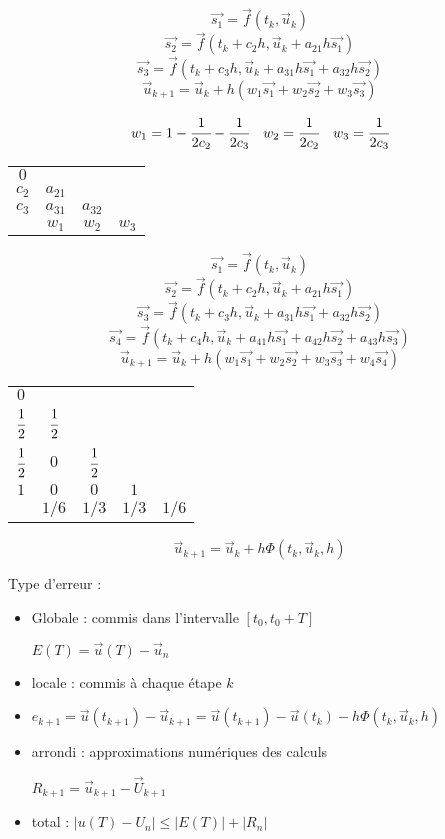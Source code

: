 
$$ \vec{s_1} = \vec{f}(t_k, \vec{u}_k) $$
$$ \vec{s_2} = \vec{f}(t_k + c_2 h, \vec{u}_k + a_{21} h \vec{s_1}) $$
$$ \vec{s_3} = \vec{f}(t_k + c_3 h, \vec{u}_k + a_{31} h \vec{s_1} + a_{32} h \vec{s_2}) $$
$$ \vec{u}_{k+1} = \vec{u}_k + h (w_1 \vec{s_1} + w_2 \vec{s_2} + w_3 \vec{s_3}) $$

$$ w_1 = 1 - \cfrac{1}{2c_2} - \cfrac{1}{2c_3} \quad w_2 = \cfrac{1}{2c_2} \quad w_3 = \cfrac{1}{2c_3} $$

\begin{tabular}{c|ccc}
    $0$ &  &  &  \\
    $c_2$ & $a_{21}$ &  &  \\
    $c_3$ & $a_{31}$ & $a_{32}$ &  \\
    \hline
          & $w_1$    & $w_2$    & $w_3$ \\
\end{tabular}


$$ \vec{s_1} = \vec{f}(t_k, \vec{u}_k) $$
$$ \vec{s_2} = \vec{f}(t_k + c_2 h, \vec{u}_k + a_{21} h \vec{s_1}) $$
$$ \vec{s_3} = \vec{f}(t_k + c_3 h, \vec{u}_k + a_{31} h \vec{s_1} + a_{32} h \vec{s_2}) $$
$$ \vec{s_4} = \vec{f}(t_k + c_4 h, \vec{u}_k + a_{41} h \vec{s_1} + a_{42} h \vec{s_2} + a_{43} h \vec{s_3}) $$
$$ \vec{u}_{k+1} = \vec{u}_k + h (w_1 \vec{s_1} + w_2 \vec{s_2} + w_3 \vec{s_3} + w_4 \vec{s_4}) $$

\begin{tabular}{c|cccc}
    $0$ &  &  &  &  \\
    $\cfrac{1}{2} $ & $\cfrac{1}{2}$ &  &  &  \\
    $\cfrac{1}{2} $ & $0$ & $\cfrac{1}{2}$ &  &  \\
    $1$ & $0$ & $0$ & $1$ &  \\
    \hline
          & $1/6$    & $1/3$    & $1/3$ & $1/6$ \\
\end{tabular}


$$ \vec{u}_{k+1} = \vec{u}_k + h \Phi(t_k, \vec{u}_k, h) $$

Type d'erreur :

\begin{itemize}
    \item Globale : commis dans l'intervalle $[t_0, t_0 + T]$
    
    $E(T) = \vec{u}(T) - \vec{u}_n$
    \item locale : commis à chaque étape $k$
    \item 
    $e_{k+1} = \vec{u}(t_{k+1}) - \vec{u}_{k+1} = \vec{u}(t_{k+1}) - \vec{u}(t_k) - h \Phi(t_k, \vec{u}_k, h)$
    \item arrondi : approximations numériques des calculs
    
    $R_{k+1} = \vec{u}_{k+1} - \vec{U}_{k+1}$

    \item total : $|u(T) - U_n| \leq |E(T)| + |R_n|$

\end{itemize}
